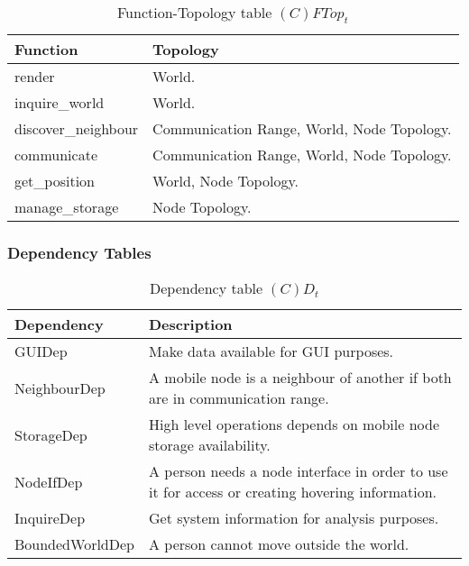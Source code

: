 \begin{table}[H]
	\centering
	\begin{tabular}{|p{4cm}|p{8cm}|}
			\hline
			\textbf{Function} & \textbf{Topology} \\
			\hline
			render & World.\\
			\hline
			inquire\_world & World.\\
			\hline
			discover\_neighbour & Communication Range, World, Node Topology. \\
			\hline
			communicate & Communication Range, World, Node Topology. \\
			\hline
			get\_position & World, Node Topology. \\
			\hline
			manage\_storage & Node Topology. \\
			\hline
		\end{tabular}
	\caption{Function-Topology table $(C)FTop_t$}
	\label{tab:cftopt}
\end{table}


\subsubsection{Dependency Tables}

\begin{table}[H]
	\centering
	\begin{tabular}{|p{4cm}|p{8cm}|}
			\hline
			\textbf{Dependency} & \textbf{Description} \\
			\hline
			GUIDep & Make data available for GUI purposes. \\
			\hline
			NeighbourDep & A mobile node is a neighbour of another if both are in
			communication range. \\
			\hline
			StorageDep & High level operations depends on mobile node storage availability. \\
			\hline
			NodeIfDep & A person needs a node interface in order to use it for access
			or creating hovering information. \\
			\hline
			InquireDep & Get system information for analysis purposes. \\
			\hline
			BoundedWorldDep & A person cannot move outside the world. \\
			\hline
		\end{tabular}
	\caption{Dependency table $(C)D_t$}
	\label{tab:cdt}
\end{table}

